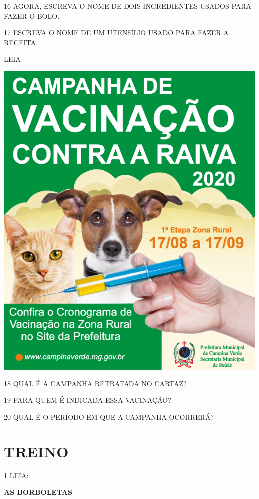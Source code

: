 
\num{16} AGORA, ESCREVA O NOME DE DOIS INGREDIENTES USADOS PARA FAZER O BOLO.


\num{17} ESCREVA O NOME DE UM UTENSÍLIO USADO PARA FAZER A RECEITA.


LEIA

\begin{center}
\includegraphics[width=.5\textwidth]{media/image131.png}
\end{center}

\num{18} QUAL É A CAMPANHA RETRATADA NO CARTAZ?


\num{19} PARA QUEM É INDICADA ESSA VACINAÇÃO?


\num{20} QUAL É O PERÍODO EM QUE A CAMPANHA OCORRERÁ?


\pagebreak
\section{TREINO}


\num{1} LEIA:

\textbf{AS BORBOLETAS}

